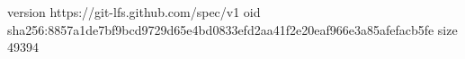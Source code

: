 version https://git-lfs.github.com/spec/v1
oid sha256:8857a1de7bf9bcd9729d65e4bd0833efd2aa41f2e20eaf966e3a85afefacb5fe
size 49394
